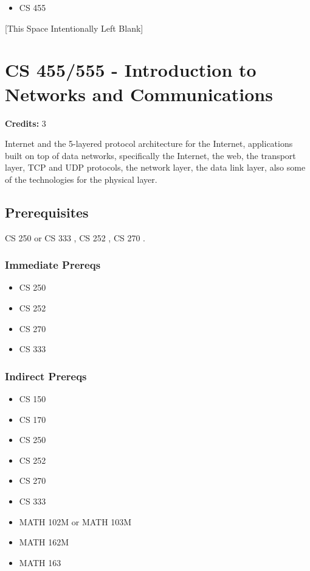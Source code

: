 \documentclass[]{article}
\providecommand{\tightlist}{%
  \setlength{\itemsep}{0pt}\setlength{\parskip}{0pt}}
\newcommand{\pagebreakhere}{
\vspace*{\fill}
\begin{center}
[This Space Intentionally Left Blank]
\end{center}
\vspace*{\fill}
\newpage
}
\begin{document}
\begin{itemize}
\tightlist
\item
  CS 455
\end{itemize}

\pagebreakhere
\section{CS 455/555 - Introduction to Networks and
Communications}\label{cs-455555---introduction-to-networks-and-communications}

\textbf{Credits:} 3

Internet and the 5-layered protocol architecture for the Internet,
applications built on top of data networks, specifically the Internet,
the web, the transport layer, TCP and UDP protocols, the network layer,
the data link layer, also some of the technologies for the physical
layer.

\subsection{Prerequisites}\label{prerequisites-36}

CS 250 or CS 333 , CS 252 , CS 270 .

\subsubsection{Immediate Prereqs}\label{immediate-prereqs-28}

\begin{itemize}
\tightlist
\item
  CS 250
\item
  CS 252
\item
  CS 270
\item
  CS 333
\end{itemize}

\subsubsection{Indirect Prereqs}\label{indirect-prereqs-28}

\begin{itemize}
\tightlist
\item
  CS 150
\item
  CS 170
\item
  CS 250
\item
  CS 252
\item
  CS 270
\item
  CS 333
\item
  MATH 102M or MATH 103M
\item
  MATH 162M
\item
  MATH 163
\end{itemize}
\end{document}
